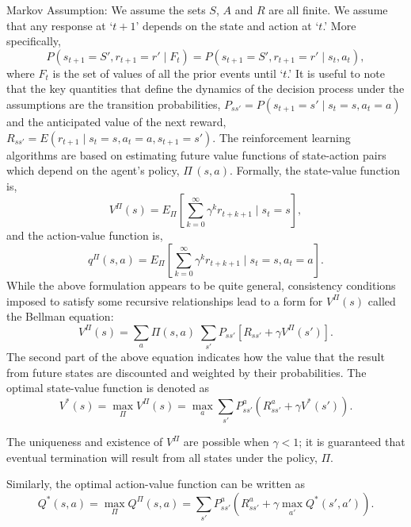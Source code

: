 \noindent Markov Assumption: We assume the sets $S$, $A$ and $R$ are all finite. We assume that any response at `$t+1$' depends on the state and action at `$t$.' More specifically, 
	\begin{equation} \label{eqn:pstpone}
	P(s_{t+1}=S', r_{t+1}=r'  \;|\; F_t)= P(s_{t+1}=S', r_{t+1}=r'  \;|\; s_t,a_t),
	\end{equation}
where $F_t$ is the set of values of all the prior events until `$t$.' It is useful to note that the key quantities that define the dynamics of the decision process under the assumptions are the transition probabilities, $P_{ss'}= P(s_{t+1}=s' \;|\; s_t=s, a_t=a)$ and the anticipated value of the next reward, $R_{ss'}= E(r_{t+1} \;|\; s_t= s, a_t= a, s_{t+1}= s')$. The reinforcement learning algorithms are based on estimating future value functions of state-action pairs which depend on the agent's policy, $\Pi\, (s,a)$. Formally, the state-value function is,
	\begin{equation} \label{eqn:statevalue}
	V^\Pi(s)= E_\Pi \left[ \sum_{k=0}^\infty \gamma^k r_{t+k+1} \;|\; s_t=s \right],
	\end{equation}
and the action-value function is,
	\begin{equation} \label{eqn:actionvalue}
	q^\Pi(s,a)= E_\Pi \left[ \sum_{k=0}^\infty \gamma^k r_{t+k+1} \;|\; s_t=s, a_t=a \right].
	\end{equation}
While the above formulation appears to be quite general, consistency conditions imposed to satisfy some recursive relationships lead to a form for $V^\Pi(s)$ called the Bellman equation:
	\begin{equation} \label{eqn:vprods}
	V^\Pi(s)= \sum_a \Pi (s,a) \; \sum_{s'} P_{ss'} [ R_{ss'} + \gamma V^\Pi(s')].
	\end{equation}
The second part of the above equation indicates how the value that the result from future states are discounted and weighted by their probabilities. The optimal state-value function is denoted as
	\begin{equation} \label{eqn:statevstar}
	V^*(s)= \max_\Pi V^\Pi(s)= \max_a \sum_{s'} P_{ss'}^a(R_{ss'}^a + \gamma V^*(s')).
	\end{equation}

The uniqueness and existence of $V^\Pi$ are possible when $\gamma < 1$; it is guaranteed that eventual termination will result from all states under the policy, $\Pi$. \twomedskip

Similarly, the optimal action-value function can be written as
	\begin{equation} \label{eqn:actionvalueqstar}
	Q^*(s,a)= \max_\Pi Q^\Pi(s,a)= \sum_{s'} P_{ss'}^a( R_{ss'}^a + \gamma \max_{a'} Q^*(s',a') ).
	\end{equation}


